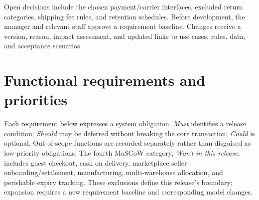 Open decisions include the chosen payment/carrier interfaces, excluded return categories, shipping fee rules, and retention schedules. Before development, the manager and relevant staff approve a requirement baseline. Changes receive a version, reason, impact assessment, and updated links to use cases, rules, data, and acceptance scenarios.

\section{Functional requirements and priorities}
Each requirement below expresses a system obligation. \emph{Must} identifies a release condition; \emph{Should} may be deferred without breaking the core transaction; \emph{Could} is optional. Out-of-scope functions are recorded separately rather than disguised as low-priority obligations.
The fourth MoSCoW category, \emph{Won't in this release}, includes guest checkout, cash on delivery, marketplace seller onboarding/settlement, manufacturing, multi-warehouse allocation, and perishable expiry tracking. These exclusions define this release's boundary; expansion requires a new requirement baseline and corresponding model changes.
